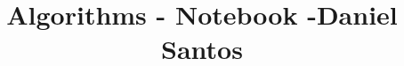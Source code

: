 \documentclass[pt]{extarticle}
\title{\vspace{-4ex}\Large{Algorithms - Notebook -Daniel Santos}}
\author{}
\date{}
\begin{document}
\begin{landscape}
\begin{multicols}{2}

\maketitle
\vspace{-13ex}
\tableofcontents
\pagestyle{fancy}



\end{multicols}
\end{landscape}
\end{document}
